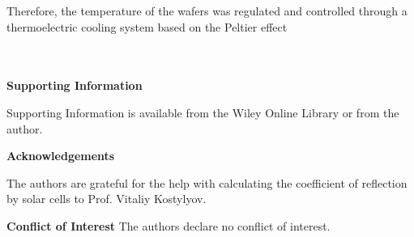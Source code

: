 \documentclass{WileyMSP-template}
\begin{document}
Therefore, the temperature of the
wafers was regulated and controlled through a thermoelectric
cooling system based on the Peltier effect

\\
\\



\medskip
\textbf{Supporting Information} \par %
Supporting Information is available from the Wiley Online Library or from the author.



\medskip
\textbf{Acknowledgements} \par %
The authors are grateful for the help with calculating the coefficient of reflection by solar cells to Prof. Vitaliy Kostylyov.

\medskip
\textbf{Conflict of Interest}
The authors declare no conflict of interest.

\medskip








\end{document}
